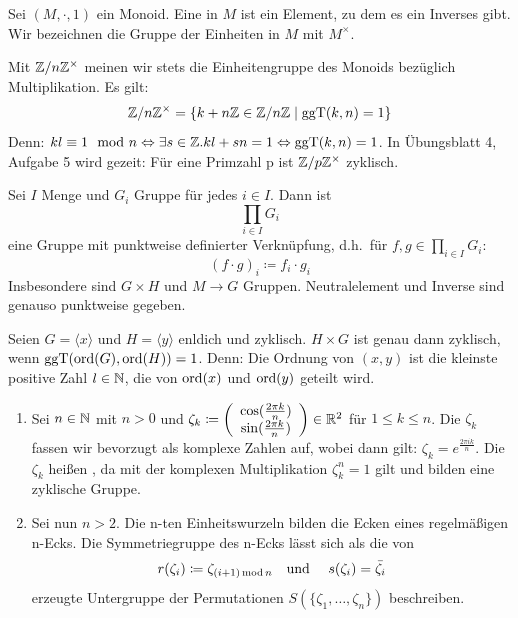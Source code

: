 \begin{definition}
  Sei \((M,\cdot,1)\) ein Monoid.
  Eine  in \(M\) ist ein Element, zu dem es ein Inverses gibt.
  Wir bezeichnen die Gruppe der Einheiten in \(M\) mit \(M^\times\).
\end{definition}

\begin{beispiel}
  Mit \(\mathbb{Z}/n\mathbb{Z}^\times\) meinen wir stets die Einheitengruppe des Monoids bezüglich Multiplikation. Es gilt:
  \[
  \mathbb{Z}/n\mathbb{Z}^\times=\{k+n\mathbb{Z} \in \mathbb{Z}/n\mathbb{Z}\mid \mathrm{ggT}(k,n)=1\}
  \]
  Denn: \(kl\equiv 1\mod n \Leftrightarrow \exists s\in\mathbb{Z}. kl+sn=1
  \Leftrightarrow \mathrm{ggT}(k,n)=1\).
  In Übungsblatt 4, Aufgabe 5 wird gezeit: Für eine Primzahl p ist \(\mathbb{Z}/p\mathbb{Z}^\times\) zyklisch.
\end{beispiel}

\begin{definition}
  Sei \(I\) Menge und \(G_i\) Gruppe für jedes \(i\in I\).
  Dann ist
  \[\prod_{i\in I}G_i\]
  eine Gruppe mit punktweise definierter Verknüpfung, d.h.\  für \(f,g\in\prod_{i\in I} G_i\):
  \[
  (f\cdot g)_i\coloneq f_i\cdot g_i
  \]
  Insbesondere sind \(G\times H\) und \(M\to G\) Gruppen.
  Neutralelement und Inverse sind genauso punktweise gegeben.
\end{definition}

\begin{bemerkung}
  Seien \(G=\langle x\rangle\) und \(H=\langle y \rangle\) enldich und zyklisch.
  \(H\times G\) ist genau dann zyklisch, wenn \(\mathrm{ggT}(\mathrm{ord}(G),\mathrm{ord}(H))=1\).
  Denn: Die Ordnung von \((x,y)\) ist die kleinste positive Zahl \(l\in \mathbb{N}\),
  die von \(\mathrm{ord}(x)\) und \(\mathrm{ord}(y)\) geteilt wird.
\end{bemerkung}

\begin{beispiel}
  \begin{enumerate}
  \item Sei \(n\in\mathbb{N}\) mit \(n>0\) und \(\zeta_k\coloneq \left( 
  \begin{array}{c}
    \cos(\frac{2\pi k}{n}) \\
    \sin(\frac{2\pi k}{n})
  \end{array}
  \right)\in\mathbb{R}^2\) für \(1\leq k\leq n\).
  Die \(\zeta_k\) fassen wir bevorzugt als komplexe Zahlen auf, wobei dann gilt: \(\zeta_k=e^{\frac{2\pi i k}{n}}\).
  Die \(\zeta_k\) heißen , da mit der komplexen Multiplikation \(\zeta_k^n=1\) gilt und bilden eine zyklische Gruppe.
\item Sei nun \(n>2\). Die n-ten Einheitswurzeln bilden die Ecken eines regelmäßigen n-Ecks. Die Symmetriegruppe des n-Ecks lässt sich als die von
  \[
  r(\zeta_i)\coloneq \zeta_{(i+1)\operatorname{mod} n}\text{\quad und \quad} s(\zeta_i)=\bar{\zeta_i}
  \]
  erzeugte Untergruppe der Permutationen \(S(\{\zeta_1,\dots,\zeta_n\})\) beschreiben.
  \end{enumerate}
\end{beispiel}


